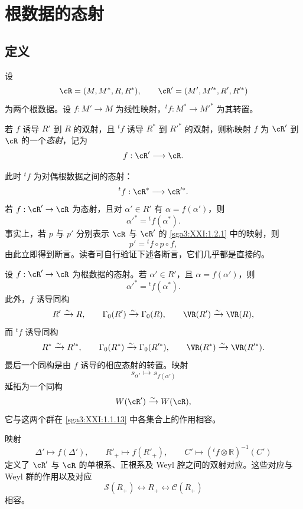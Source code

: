 \section{根数据的态射}\label{sga3:XXI:6}
\renewcommand{\thetheorem}{\thesubsection.\arabic{theorem}}

\subsection{定义}\label{sga3:XXI:6.1}

设
\[
 \cR=(M,M^\ast,R,R^\ast),
 \qquad
 \cR'=(M',M'^\ast,R',R'^\ast)
\]
为两个根数据。设 \(f:M'\to M\) 为线性映射，\({}^tf:M^\ast\to M'^\ast\) 为其转置。

\begin{definition}\label{sga3:XXI:6.1.1}
若 \(f\) 诱导 \(R'\) 到 \(R\) 的双射，且 \({}^tf\) 诱导 \(R^\ast\) 到 \(R'^\ast\) 的双射，则称映射 \(f\) 为 \(\cR'\) 到 \(\cR\) 的一个\emph{态射}，记为
\[
 f:\cR'\longrightarrow\cR.
\]
\end{definition}

此时 \({}^tf\) 为对偶根数据之间的态射：
\[
 {}^tf:\cR^\ast\longrightarrow\cR'^\ast.
\]
若 \(f:\cR'\to\cR\) 为态射，且对 \(\alpha'\in R'\) 有 \(\alpha=f(\alpha')\)，则
\[
 \alpha'^\ast={}^tf(\alpha^\ast).
\]
事实上，若 \(p\) 与 \(p'\) 分别表示 \(\cR\) 与 \(\cR'\) 的 \ref{sga3:XXI:1.2.1} 中的映射，则
\[
 p'={}^tf\circ p\circ f,
\]
由此立即得到断言。读者可自行验证下述各断言，它们几乎都是直接的。

\begin{proposition}\label{sga3:XXI:6.1.2}
设 \(f:\cR'\to\cR\) 为根数据的态射。若 \(\alpha'\in R'\)，且 \(\alpha=f(\alpha')\)，则
\[
 \alpha'^\ast={}^tf(\alpha^\ast).
\]
此外，\(f\) 诱导同构
\[
 R'\xrightarrow{\sim}R,\qquad
 \Gamma_0(R')\xrightarrow{\sim}\Gamma_0(R),\qquad
 \VR(R')\xrightarrow{\sim}\VR(R),
\]
而 \({}^tf\) 诱导同构
\[
 R^\ast\xrightarrow{\sim}R'^\ast,\qquad
 \Gamma_0(R^\ast)\xrightarrow{\sim}\Gamma_0(R'^\ast),\qquad
 \VR(R^\ast)\xrightarrow{\sim}\VR(R'^\ast).
\]
最后一个同构是由 \(f\) 诱导的相应态射的转置。映射
\[
 s_{\alpha'}\longmapsto s_{f(\alpha')}
\]
延拓为一个同构
\[
 W(\cR')\xrightarrow{\sim}W(\cR),
\]
它与这两个群在 \ref{sga3:XXI:1.1.13} 中各集合上的作用相容。
\end{proposition}

\begin{proposition}\label{sga3:XXI:6.1.3}
映射
\[
 \Delta'\longmapsto f(\Delta'),\qquad
 R'_+\longmapsto f(R'_+),\qquad
 C'\longmapsto({}^tf\otimes\mathbb R)^{-1}(C')
\]
定义了 \(\cR'\) 与 \(\cR\) 的单根系、正根系及 Weyl 腔之间的双射对应。这些对应与 Weyl 群的作用以及对应
\[
 \mathscr{S}(R_+)\longleftrightarrow R_+
 \longleftrightarrow\mathscr{C}(R_+)
\]
相容。
\end{proposition}

